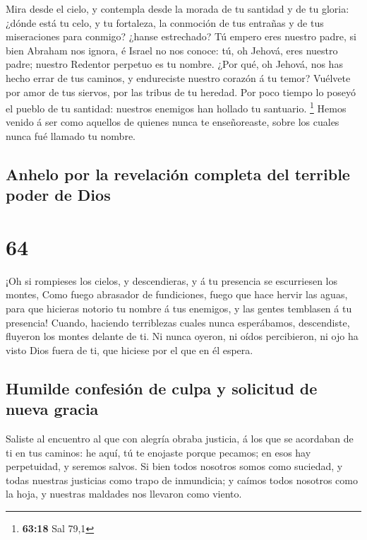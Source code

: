  Mira desde el cielo, y contempla desde la morada de tu
santidad y de tu gloria: ¿dónde está tu celo, y tu fortaleza, la
conmoción de tus entrañas y de tus miseraciones para conmigo? ¿hanse
estrechado?  Tú empero eres nuestro padre, si bien
Abraham nos ignora, é Israel no nos conoce: tú, oh Jehová, eres nuestro
padre; nuestro Redentor perpetuo es tu nombre.  ¿Por qué,
oh Jehová, nos has hecho errar de tus caminos, y endureciste nuestro
corazón á tu temor? Vuélvete por amor de tus siervos, por las tribus de
tu heredad.  Por poco tiempo lo poseyó el pueblo de tu
santidad: nuestros enemigos han hollado tu santuario. \footnote{\textbf{63:18}
  Sal 79,1}  Hemos venido á ser como aquellos de quienes
nunca te enseñoreaste, sobre los cuales nunca fué llamado tu nombre.

\hypertarget{anhelo-por-la-revelaciuxf3n-completa-del-terrible-poder-de-dios}{%
\subsection{Anhelo por la revelación completa del terrible poder de
Dios}\label{anhelo-por-la-revelaciuxf3n-completa-del-terrible-poder-de-dios}}

\hypertarget{section-63}{%
\section{64}\label{section-63}}

 ¡Oh si rompieses los cielos, y descendieras, y á tu
presencia se escurriesen los montes,  Como fuego abrasador
de fundiciones, fuego que hace hervir las aguas, para que hicieras
notorio tu nombre á tus enemigos, y las gentes temblasen á tu presencia!
 Cuando, haciendo terriblezas cuales nunca esperábamos,
descendiste, fluyeron los montes delante de ti.  Ni nunca
oyeron, ni oídos percibieron, ni ojo ha visto Dios fuera de ti, que
hiciese por el que en él espera.

\hypertarget{humilde-confesiuxf3n-de-culpa-y-solicitud-de-nueva-gracia}{%
\subsection{Humilde confesión de culpa y solicitud de nueva
gracia}\label{humilde-confesiuxf3n-de-culpa-y-solicitud-de-nueva-gracia}}

 Saliste al encuentro al que con alegría obraba justicia,
á los que se acordaban de ti en tus caminos: he aquí, tú te enojaste
porque pecamos; en esos hay perpetuidad, y seremos salvos.
 Si bien todos nosotros somos como suciedad, y todas
nuestras justicias como trapo de inmundicia; y caímos todos nosotros
como la hoja, y nuestras maldades nos llevaron como viento.

